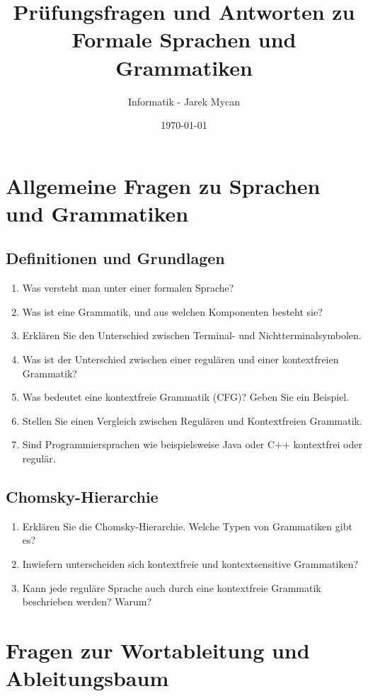 \documentclass[a4paper,12pt]{article}
\begin{document}
	
	\title{Prüfungsfragen und Antworten zu Formale Sprachen und Grammatiken}
	\author{Informatik - Jarek Mycan}
	\date{\today}
	\maketitle
	
	\section*{Allgemeine Fragen zu Sprachen und Grammatiken}
	
	\subsection*{Definitionen und Grundlagen}
	\begin{enumerate}
		\item Was versteht man unter einer formalen Sprache?
		\item Was ist eine Grammatik, und aus welchen Komponenten besteht sie?
		\item Erklären Sie den Unterschied zwischen Terminal- und Nichtterminalsymbolen.
		\item Was ist der Unterschied zwischen einer regulären und einer kontextfreien Grammatik?
		\item Was bedeutet eine \glqq kontextfreie Grammatik\grqq{} (CFG)? Geben Sie ein Beispiel.
		\item Stellen Sie einen Vergleich zwischen Regulären  und Kontextfreien Grammatik.
		\item Sind Programmiersprachen wie beispielsweise Java oder C++ kontextfrei oder regulär.
	\end{enumerate}
	
	\subsection*{Chomsky-Hierarchie}
	\begin{enumerate}
		\item Erklären Sie die Chomsky-Hierarchie. Welche Typen von Grammatiken gibt es?
		\item Inwiefern unterscheiden sich kontextfreie und kontextsensitive Grammatiken?
		\item Kann jede reguläre Sprache auch durch eine kontextfreie Grammatik beschrieben werden? Warum?
	\end{enumerate}
	
	\section*{Fragen zur Wortableitung und Ableitungsbaum}
	
\end{document}
